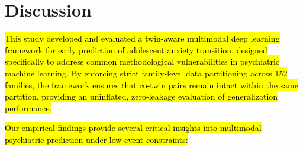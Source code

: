 \documentclass[10pt,letterpaper]{article}
\begin{document}
\section*{Discussion}

\hl{This study developed and evaluated a twin-aware multimodal deep learning framework for early prediction of adolescent anxiety transition, designed specifically to address common methodological vulnerabilities in psychiatric machine learning. By enforcing strict family-level data partitioning across 152 families, the framework ensures that co-twin pairs remain intact within the same partition, providing an uninflated, zero-leakage evaluation of generalization performance.}

\hl{Our empirical findings provide several critical insights into multimodal psychiatric prediction under low-event constraints:}
\end{document}
